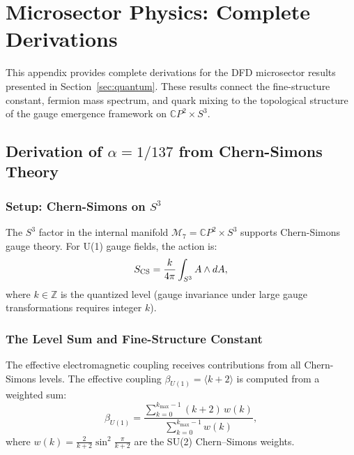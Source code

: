 
\section{Microsector Physics: Complete Derivations}\label{app:microsector}

This appendix provides complete derivations for the DFD microsector results presented 
in Section~\ref{sec:quantum}. These results connect the fine-structure constant, 
fermion mass spectrum, and quark mixing to the topological structure of the 
gauge emergence framework on $\mathbb{C}P^2 \times S^3$.

\subsection{Derivation of $\alpha = 1/137$ from Chern-Simons Theory}\label{app:alpha-cs}

\subsubsection{Setup: Chern-Simons on $S^3$}

The $S^3$ factor in the internal manifold $\mathcal{M}_7 = \mathbb{C}P^2 \times S^3$ 
supports Chern-Simons gauge theory. For U(1) gauge fields, the action is:
\begin{equation}
S_{\rm CS} = \frac{k}{4\pi} \int_{S^3} A \wedge dA,
\end{equation}
where $k \in \mathbb{Z}$ is the quantized level (gauge invariance under large gauge 
transformations requires integer $k$).

\subsubsection{The Level Sum and Fine-Structure Constant}

The effective electromagnetic coupling receives contributions from all Chern-Simons 
levels. The effective coupling $\beta_{U(1)} = \langle k + 2 \rangle$ is computed from a weighted sum:
\begin{equation}
\beta_{U(1)} = \frac{\sum_{k=0}^{k_{\max}-1} (k+2)\, w(k)}{\sum_{k=0}^{k_{\max}-1} w(k)},
\end{equation}
where $w(k) = \frac{2}{k+2}\sin^2\frac{\pi}{k+2}$ are the SU(2) Chern--Simons weights.


